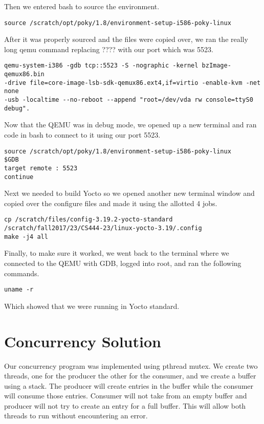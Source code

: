 \documentclass[10pt,letterpaper,onecolumn,draftclsnofoot]{IEEEtran}
\begin{document}
Then we entered bash to source the environment.

\begin{lstlisting}
source /scratch/opt/poky/1.8/environment-setup-i586-poky-linux
\end{lstlisting}

After it was properly sourced and the files were copied over, we ran the really
long qemu command replacing ???? with our port which was 5523.

\begin{lstlisting}
qemu-system-i386 -gdb tcp::5523 -S -nographic -kernel bzImage-qemux86.bin 
-drive file=core-image-lsb-sdk-qemux86.ext4,if=virtio -enable-kvm -net none 
-usb -localtime --no-reboot --append "root=/dev/vda rw console=ttyS0 debug".
\end{lstlisting}

Now that the QEMU was in debug mode, we opened up a new terminal and ran code
in bash to connect to it using our port 5523.

\begin{lstlisting}
source /scratch/opt/poky/1.8/environment-setup-i586-poky-linux
$GDB
target remote : 5523
continue
\end{lstlisting}

Next we needed to build Yocto so we opened another new terminal window and
copied over the configure files and made it using the allotted 4 jobs.

\begin{lstlisting}
cp /scratch/files/config-3.19.2-yocto-standard 
/scratch/fall2017/23/CS444-23/linux-yocto-3.19/.config
make -j4 all
\end{lstlisting}

Finally, to make sure it worked, we went back to the terminal where we
connected to the QEMU with GDB, logged into root, and ran the following commands.

\begin{lstlisting}
uname -r
\end{lstlisting}

Which showed that we were running in Yocto standard.

\section{Concurrency Solution}
Our concurrency program was implemented using pthread mutex. We create two 
threads, one for the producer the other for the consumer, and we create a buffer 
using a stack. The producer will create entries in the buffer while the consumer 
will consume those entries. Consumer will not take from an empty buffer and 
producer will not try to create an entry for a full buffer. This will allow 
both threads to run without encountering an error.
\end{document}
